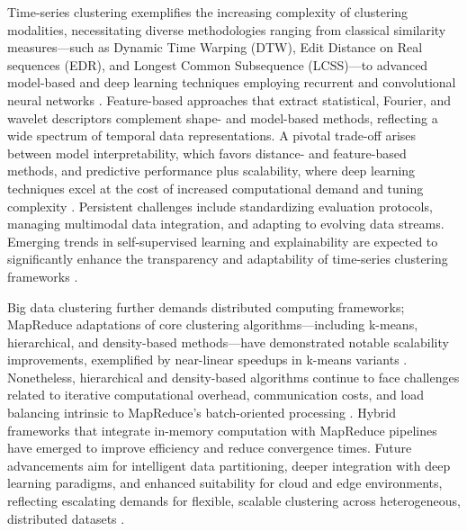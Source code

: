 \documentclass[sigconf]{acmart}
\begin{document}
Time-series clustering exemplifies the increasing complexity of clustering modalities, necessitating diverse methodologies ranging from classical similarity measures—such as Dynamic Time Warping (DTW), Edit Distance on Real sequences (EDR), and Longest Common Subsequence (LCSS)—to advanced model-based and deep learning techniques employing recurrent and convolutional neural networks \cite{ref23}. Feature-based approaches that extract statistical, Fourier, and wavelet descriptors complement shape- and model-based methods, reflecting a wide spectrum of temporal data representations. A pivotal trade-off arises between model interpretability, which favors distance- and feature-based methods, and predictive performance plus scalability, where deep learning techniques excel at the cost of increased computational demand and tuning complexity \cite{ref23}. Persistent challenges include standardizing evaluation protocols, managing multimodal data integration, and adapting to evolving data streams. Emerging trends in self-supervised learning and explainability are expected to significantly enhance the transparency and adaptability of time-series clustering frameworks \cite{ref23}.

Big data clustering further demands distributed computing frameworks; MapReduce adaptations of core clustering algorithms—including k-means, hierarchical, and density-based methods—have demonstrated notable scalability improvements, exemplified by near-linear speedups in k-means variants \cite{ref16}. Nonetheless, hierarchical and density-based algorithms continue to face challenges related to iterative computational overhead, communication costs, and load balancing intrinsic to MapReduce’s batch-oriented processing \cite{ref16}. Hybrid frameworks that integrate in-memory computation with MapReduce pipelines have emerged to improve efficiency and reduce convergence times. Future advancements aim for intelligent data partitioning, deeper integration with deep learning paradigms, and enhanced suitability for cloud and edge environments, reflecting escalating demands for flexible, scalable clustering across heterogeneous, distributed datasets \cite{ref16}.
\end{document}
